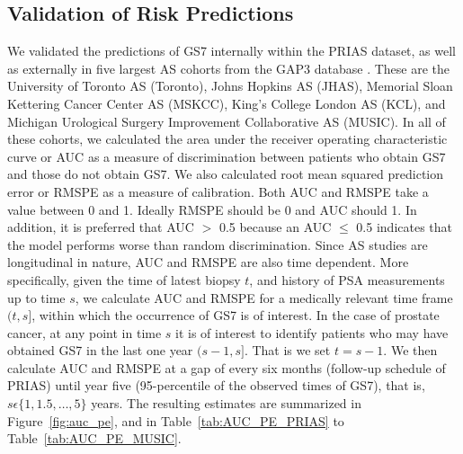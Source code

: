 \subsection{Validation of Risk Predictions}
We validated the predictions of GS7 internally within the PRIAS dataset, as well as externally in five largest AS cohorts from the GAP3 database \citep{gap3_2018}. These are the University of Toronto AS (Toronto), Johns Hopkins AS (JHAS), Memorial Sloan Kettering Cancer Center AS (MSKCC), King's College London AS (KCL), and Michigan Urological Surgery Improvement Collaborative AS (MUSIC). In all of these cohorts, we calculated the area under the receiver operating characteristic curve or AUC \cite{rizopoulos2017dynamic} as a measure of discrimination between patients who obtain GS7 and those do not obtain GS7. We also calculated root mean squared prediction error or RMSPE \cite{rizopoulos2017dynamic} as a measure of calibration. Both AUC and RMSPE take a value between 0 and 1. Ideally RMSPE should be 0 and AUC should 1. In addition, it is preferred that AUC $>$ 0.5 because an AUC $\leq$ 0.5 indicates that the model performs worse than random discrimination. Since AS studies are longitudinal in nature, AUC and RMSPE are also time dependent. More specifically, given the time of latest biopsy $t$, and history of PSA measurements up to time $s$, we calculate AUC and RMSPE for a medically relevant time frame $(t, s]$, within which the occurrence of GS7 is of interest. In the case of prostate cancer, at any point in time $s$ it is of interest to identify patients who may have obtained GS7 in the last one year $(s-1, s]$. That is we set $t=s-1$. We then calculate AUC and RMSPE at a gap of every six months (follow-up schedule of PRIAS) until year five (95-percentile of the observed times of GS7), that is, $s \epsilon \{1, 1.5, \ldots, 5\}$ years. The resulting estimates are summarized in Figure~\ref{fig:auc_pe}, and in Table~\ref{tab:AUC_PE_PRIAS} to Table~\ref{tab:AUC_PE_MUSIC}.

